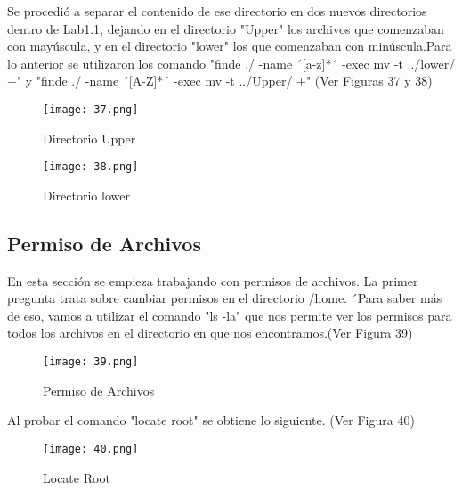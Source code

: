 \documentclass[
  letterpaper, 
  maincolor=black,
  sectioncolor=black!90,
  subsectioncolor=black!70,
  itemtextcolor=black!40,
]{fortysecondscv}
\begin{document}
{Se procedió a separar el contenido de ese directorio en dos nuevos directorios dentro de Lab1.1, dejando en el directorio "Upper" los archivos que comenzaban con mayúscula, y en el directorio "lower" los que comenzaban con minúscula.Para lo anterior se utilizaron los comando "finde ./ -name ´[a-z]*´ -exec mv -t ../lower/ {}+" y "finde ./ -name ´[A-Z]*´ -exec mv -t ../Upper/ {}+" (Ver Figuras 37 y 38)}

\begin{center}
    \begin{figure}[H]
    \centering
    \texttt{[image: 37.png]}
    \caption{Directorio Upper}
    \label{fig:10.png}
    \end{figure}
\end{center}

\begin{center}
    \begin{figure}[H]
    \centering
    \texttt{[image: 38.png]}
    \caption{Directorio lower}
    \label{fig:10.png}
    \end{figure}
\end{center}

\subsection{Permiso de Archivos}
{En esta sección se empieza trabajando con permisos de archivos. La primer pregunta trata sobre cambiar permisos en el directorio /home.}
´{Para saber más de eso, vamos a utilizar el comando "ls -la" que nos permite ver los permisos para todos los archivos en el directorio en que nos encontramos.(Ver Figura 39)}

\begin{center}
    \begin{figure}[H]
    \centering
    \texttt{[image: 39.png]}
    \caption{Permiso de Archivos}
    \label{fig:10.png}
    \end{figure}
\end{center}

{Al probar el comando "locate root" se obtiene lo siguiente. (Ver Figura 40)}

\begin{center}
    \begin{figure}[H]
    \centering
    \texttt{[image: 40.png]}
    \caption{Locate Root}
    \label{fig:10.png}
    \end{figure}
\end{center}
\end{document}
